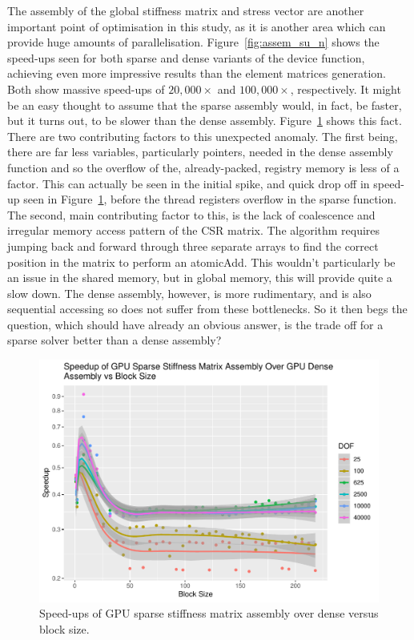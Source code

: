 The assembly of the global stiffness matrix and stress vector are another important point of optimisation in this study, as it is another area which can provide huge amounts of parallelisation. Figure~\ref{fig:assem_su_n} shows the speed-ups seen for both sparse and dense variants of the device function, achieving even more impressive results than the element matrices generation. Both show massive speed-ups of $20,000\times$ and $100,000\times$, respectively. It might be an easy thought to assume that the sparse assembly would, in fact, be faster, but it turns out, to be slower than the dense assembly. Figure~\ref{fig:sparse_dense_assem} shows this fact. There are two contributing factors to this unexpected anomaly. The first being, there are far less variables, particularly pointers, needed in the dense assembly function and so the overflow of the, already-packed, registry memory is less of a factor. This can actually be seen in the initial spike, and quick drop off in speed-up seen in Figure~\ref{fig:sparse_dense_assem}, before the thread registers overflow in the sparse function. The second, main contributing factor to this, is the lack of coalescence and irregular memory access pattern of the CSR matrix. The algorithm requires jumping back and forward through three separate arrays to find the correct position in the matrix to perform an atomicAdd. This wouldn't particularly be an issue in the shared memory, but in global memory, this will provide quite a slow down. The dense assembly, however, is more rudimentary, and is also sequential accessing so does not suffer from these bottlenecks. So it then begs the question, which should have already an obvious answer, is the trade off for a sparse solver better than a dense assembly?

\begin{figure}
	\centering
	\includegraphics[width=0.55\linewidth]{Plots/assem_dev_gpu_sparse_dense_speedup_vs_b}
	\caption{Speed-ups of GPU sparse stiffness matrix assembly over dense versus block size.}
	\label{fig:sparse_dense_assem}
\end{figure}

